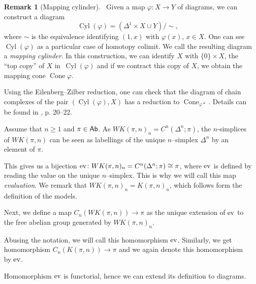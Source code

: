 \documentclass[12pt,a4wide]{article}
\theoremstyle{plain}
\theoremstyle{definition}
\newtheorem{rem}[thm]{Remark}
\newcommand{\dev}{\mathop\mathrm{{ev}}\nolimits}
\newcommand{\heading}[1]{\vspace{1ex}\par\noindent{\bf\boldmath #1}}
\newcommand{\Engen}{WK(\pi,\then)}
\newcommand{\Kpin}{K(\pi,\then)}
\DeclareMathOperator\MCyltemp{{Cyl}}
\newcommand{\MCyl}[1]{\MCyltemp{({#1})}}
\newcommand{\then}{n}
\newcommand{\thedim}{{n}}
\newcommand{\thedimm}{{k}}
\newcommand{\stdsimp}[1]{\Delta^{#1}}
\renewcommand\:{\colon}
\newcommand{\dY}{Y}
\newcommand{\dX}{X}
\newcommand{\dpi}{\pi}
\newcommand{\dK}{K}
\newcommand{\dE}{E}
\newcommand{\dC}{{C}}
\DeclareMathOperator\dCone{{Cone}}
\begin{document}
\begin{rem}[Mapping cylinder]~\label{rem:mapcylinder}
Given a map  $\varphi\: \dX \to \dY$ of diagrams, we can construct a diagram \[\MCyl{\varphi} =  (\Delta^1 \times \dX \cup \dY)/\sim,\]
 where $\sim$ is the equivalence identifying $(1,x)$ with $\varphi(x)$,
$x\in X$. One can see $\MCyl{\varphi}$ as a particular case of homotopy colimit. We call the resulting diagram a \emph{mapping cylinder}. In this construction, we can identify  $\dX$ with $\{0\} \times \dX$,
the ``top copy'' of $\dX$ in~$\MCyl{\varphi}$ and if we contract this copy of $\dX$, we obtain the mapping cone $\dCone{\varphi}$.

Using the Eilenberg--Zilber reduction, one can check that the diagram of chain complexes of the pair $(\MCyl\varphi,\dX)$
has a reduction to $\dCone_{\varphi*}$. Details can be found in \cite{weibel}, p. 20--22.
\end{rem}





\heading{Evaluation maps}

Assume that $\thedim\geq1$ and $\pi \in \mathsf{Ab}$. As $\Engen_\thedim =  C^\thedim (\stdsimp{\thedim}; \pi)$, the $\thedim$-simplices of $\Engen$ can be seen as labellings of the unique $\thedim$--simplex $\stdsimp{\thedim}$ by an element of $\pi$. 

This gives us a bijection $\ev\colon \Engen_\thedim =  C^\thedim (\stdsimp{\thedim}; \pi) \cong \pi$, where
 $\mathop\mathrm{ev}\nolimits$ is defined by reading the value on the unique $\thedim$--simplex. This is why we will call this map \emph{evaluation}. We remark that $\Engen_\thedim = \Kpin_\thedim$, which follows form the definition of the models.

Next, we define a map $C_\thedim(\Engen) \to \pi$ as the unique extension of $\mathop\mathrm{ev}\nolimits$ to the free abelian group generated by $\Engen_\thedim$. 


Abusing the notation, we will call this homomorphism $\mathop\mathrm{ev}\nolimits$. Similarly, we get homomorphism $C_\thedim(\Kpin) \to \pi$ and we again denote this homomorphism by $\mathop\mathrm{ev}\nolimits$. 

Homomorphism $\mathop\mathrm{ev}\nolimits$ is functorial, hence we can extend its definition to diagrams. %
\end{document}
